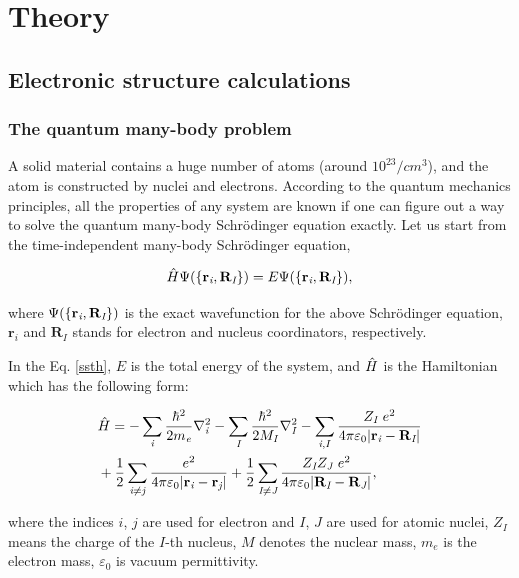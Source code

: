 \documentclass[a4paper, 12pt, titlepage,oneside,drop]{kthesis}
\begin{document}
\chapter{Theory}

\section{Electronic structure calculations }
\label{ch:dft}

\subsection{The quantum many-body problem}
\label{ch:mb}

\noindent A solid material contains a huge number of atoms (around $10^{23}/cm^3$), and the atom is constructed by nuclei and electrons. 
According to the quantum mechanics principles, all the properties of any system are known if one can figure out a way to solve 
the quantum many-body Schrödinger equation exactly. Let us start from the time-independent many-body Schrödinger equation,

\begin{equation}\label{ssth}
 {\hat{H}} {\Psi(\{ {\textbf r}_{\textit i}, {\textbf R}_{\textit I} \})} = {E} {\Psi(\{ {\textbf r}_{\textit i}, {\textbf R}_{\textit I} \})},
\end{equation}

where $\Psi(\{ {\textbf r}_{\textit i}, {\textbf R}_{\textit I} \})$  is the exact wavefunction for the above Schrödinger equation, $\textbf{r}_\textit{i}$ and $\textbf{R}_\textit{I}$  stands for electron and
nucleus coordinators, respectively.

In the Eq. \ref{ssth}, $E$ is the total energy of the system, and $\hat{H}$ is the Hamiltonian which has the following form:

\begin{equation}\label{th}
\begin{split}
& \hath = - \sumi<i> {\frac{\hbar^{2}}{2 m_{\textit e}}}   \nablaia<i> - \sumi<I> {\frac{\hbar^{2}}{2 M_\textit{I}}} \nablaia<I>  - \sumij<i><I> \frac{Z_\textit{I}\ e^2}{4 \pi \varepsilon_0 |\textbf{r}_\textit{i}-\textbf{R}_\textit{I}|} \\
& + \frac{1}{2} \suminj<i><j> \frac{ e^2}{4 \pi \varepsilon_0 |\textbf{r}_\textit{i}-\textbf{r}_\textit{j}|} + \frac{1}{2} \suminj<I><J> \frac{Z_\textit{I} Z_\textit{J}\  e^2}{4 \pi \varepsilon_0 |\textbf{R}_\textit{I}-\textbf{R}_\textit{J}|},
\end{split}
\end{equation}

where the indices $\textit{i}$, $\textit{j}$ are used for electron and $\textit{I}$, $\textit{J}$ are used for atomic nuclei, $Z_\textit{I}$ means the charge of the $\textit{I}$-th nucleus,
$\textit{M}$ denotes the nuclear mass, $m_e$ is the electron mass, $\varepsilon_0$ is vacuum permittivity.
\end{document}
